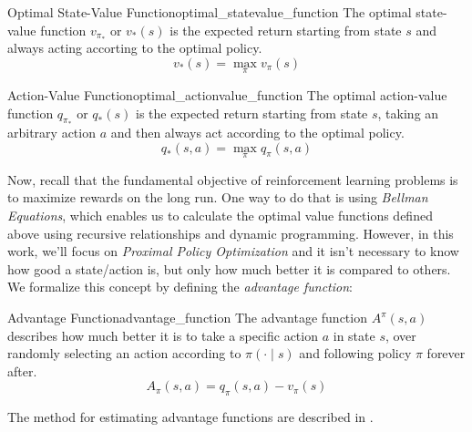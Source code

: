 \begin{definition}{Optimal State-Value Function}{optimal_statevalue_function}
      The optimal state-value function $v_{\pi_*}$ or $v_*(s)$ is the expected return starting from state $s$ and always acting accorting to the optimal policy.
      \[
            v_*(s) = \max_\pi v_\pi(s)      
      \]
\end{definition}

\begin{definition}{Action-Value Function}{optimal_actionvalue_function}
      The optimal action-value function $q_{\pi_*}$ or $q_*(s)$ is the expected return starting from state $s$, taking an arbitrary action $a$ and then always act according to the optimal policy.
      \[
            q_*(s, a) = \max_\pi q_\pi(s, a)      
      \]
\end{definition}

Now, recall that the fundamental objective of reinforcement learning problems is to maximize rewards on the long run. One way to do that is using \textit{Bellman Equations}, which enables us to calculate the optimal value functions defined above using recursive relationships and dynamic programming. However, in this work, we'll focus on \textit{Proximal Policy Optimization} and it isn't necessary to know how good a state/action is, but only how much better it is compared to others. We formalize this concept by defining the \textit{advantage function}:

\begin{definition}{Advantage Function}{advantage_function}
      The advantage function $A^{\pi}(s,a)$ describes how much better it is to take a specific action $a$ in state $s$, over randomly selecting an action according to $\pi(\cdot \mid s)$ and following policy $\pi$ forever after.
      \[
            A_\pi(s, a) = q_\pi(s, a) - v_\pi(s)      
      \]
\end{definition}
The method for estimating advantage functions are described in \cite{https://doi.org/10.48550/arxiv.1506.02438}.